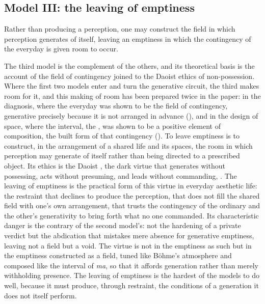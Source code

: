 \subsection{Model III: the leaving of emptiness}
\label{p23:sub:typ-model3}

\begin{claim}
Rather than producing a perception, one may construct the field in which perception generates of itself, leaving an emptiness in which the contingency of the everyday is given room to occur.
\end{claim}

The third model is the complement of the others, and its theoretical basis is the account of the field of contingency joined to the Daoist ethics of non-possession. Where the first two models enter and turn the generative circuit, the third makes room for it, and this making of room has been prepared twice in the paper: in the diagnosis, where the everyday was shown to be the field of contingency, generative precisely because it is not arranged in advance (), and in the design of space, where the interval, the , was shown to be a positive element of composition, the built form of that contingency (). To leave emptiness is to construct, in the arrangement of a shared life and its spaces, the room in which perception may generate of itself rather than being directed to a prescribed object. Its ethics is the Daoist , the dark virtue that generates without possessing, acts without presuming, and leads without commanding,  \parencite{laozi1963}. The leaving of emptiness is the practical form of this virtue in everyday aesthetic life: the restraint that declines to produce the perception, that does not fill the shared field with one's own arrangement, that trusts the contingency of the ordinary and the other's generativity to bring forth what no one commanded. Its characteristic danger is the contrary of the second model's: not the hardening of a private verdict but the abdication that mistakes mere absence for generative emptiness, leaving not a field but a void. The virtue is not in the emptiness as such but in the emptiness constructed as a field, tuned like B\"{o}hme's atmosphere and composed like the interval of \emph{ma}, so that it affords generation rather than merely withholding presence. The leaving of emptiness is the hardest of the models to do well, because it must produce, through restraint, the conditions of a generation it does not itself perform.

